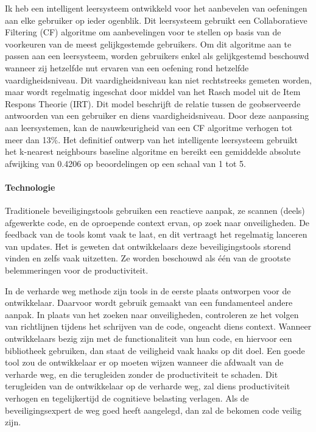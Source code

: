 Ik heb een intelligent leersysteem ontwikkeld voor het aanbevelen van oefeningen aan elke gebruiker op ieder ogenblik.
Dit leersysteem gebruikt een Collaboratieve Filtering (CF) algoritme om aanbevelingen voor te stellen op basis van de voorkeuren van de meest gelijkgestemde gebruikers.
Om dit algoritme aan te passen aan een leersysteem, worden gebruikers enkel als gelijkgestemd beschouwd wanneer zij hetzelfde nut ervaren van een oefening rond hetzelfde vaardigheidsniveau.
Dit vaardigheidsniveau kan niet rechtstreeks gemeten worden, maar wordt regelmatig ingeschat door middel van het Rasch model uit de Item Respons Theorie (IRT).
Dit model beschrijft de relatie tussen de geobserveerde antwoorden van een gebruiker en diens vaardigheidsniveau.
Door deze aanpassing aan leersystemen, kan de nauwkeurigheid van een CF algoritme verhogen tot meer dan 13\%.
Het definitief ontwerp van het intelligente leersysteem gebruikt het k-nearest neighbours baseline algoritme en bereikt een gemiddelde absolute afwijking van 0.4206 op beoordelingen op een schaal van 1 tot 5.

\paragraph{Technologie}
Traditionele beveiligingstools gebruiken een reactieve aanpak, ze scannen (deels) afgewerkte code, en de oproepende context ervan, op zoek naar onveiligheden.
De feedback van de tools komt vaak te laat, en dit vertraagt het regelmatig lanceren van updates.
Het is geweten dat ontwikkelaars deze beveiligingstools storend vinden en zelfs vaak uitzetten.
Ze worden beschouwd als één van de grootste belemmeringen voor de productiviteit.

In de verharde weg methode zijn tools in de eerste plaats ontworpen voor de ontwikkelaar.
Daarvoor wordt gebruik gemaakt van een fundamenteel andere aanpak.
In plaats van het zoeken naar onveiligheden, controleren ze het volgen van richtlijnen tijdens het schrijven van de code, ongeacht diens context.
Wanneer ontwikkelaars bezig zijn met de functionaliteit van hun code, en hiervoor een bibliotheek gebruiken, dan staat de veiligheid vaak haaks op dit doel.
Een goede tool zou de ontwikkelaar er op moeten wijzen wanneer die afdwaalt van de verharde weg, en die terugleiden zonder de productiviteit te schaden.
Dit terugleiden van de ontwikkelaar op de verharde weg, zal diens productiviteit verhogen en tegelijkertijd de cognitieve belasting verlagen.
Als de beveiligingsexpert de weg goed heeft aangelegd, dan zal de bekomen code veilig zijn.

